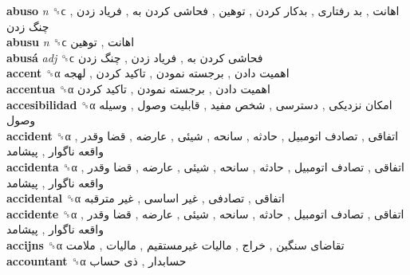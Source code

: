 \textbf{abuso} \emph{n}  ␝ϲ   اهانت ,  بد رفتاری ,  بدکار کردن ,  توهین ,  فحاشی کردن به ,  فریاد زدن ,  چنگ زدن   \\
\textbf{abusu} \emph{n}  ␝ϲ   اهانت ,  توهین   \\
\textbf{abusá} \emph{adj}  ␝ϲ   فحاشی کردن به ,  فریاد زدن ,  چنگ زدن   \\
\textbf{accent} ␝α   اهمیت دادن ,  برجسته نمودن ,  تاکید کردن ,  لهجه   \\
\textbf{accentua} ␝α   اهمیت دادن ,  برجسته نمودن ,  تاکید کردن   \\
\textbf{accesibilidad} ␝α   امکان نزدیکی ,  دسترسی ,  شخص مفید ,  قابلیت وصول ,  وسیله وصول   \\
\textbf{accident} ␝α   اتفاقی ,  تصادف اتومبیل ,  حادثه ,  سانحه ,  شیئی ,  عارضه ,  قضا وقدر ,  واقعه ناگوار ,  پیشامد   \\
\textbf{accidenta} ␝α   اتفاقی ,  تصادف اتومبیل ,  حادثه ,  سانحه ,  شیئی ,  عارضه ,  قضا وقدر ,  واقعه ناگوار ,  پیشامد   \\
\textbf{accidental} ␝α   اتفاقی ,  تصادفی ,  غیر اساسی ,  غیر مترقبه   \\
\textbf{accidente} ␝α   اتفاقی ,  تصادف اتومبیل ,  حادثه ,  سانحه ,  شیئی ,  عارضه ,  قضا وقدر ,  واقعه ناگوار ,  پیشامد   \\
\textbf{accijns} ␝α   تقاضای سنگین ,  خراج ,  مالیات غیرمستقیم ,  مالیات ,  ملامت   \\
\textbf{accountant} ␝α   حسابدار ,  ذی حساب   \\
